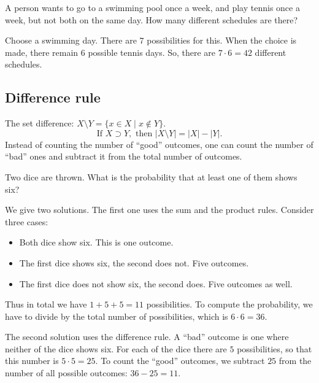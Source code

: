 \begin{page}
\setcounter{section}{1}
\setcounter{subsection}{2}
\setcounter{dfn}{2}
\label{portion:9}

\begin{exl}
A person wants to go to a swimming pool once a week, and play tennis once a week, but not both on the same day.
How many different schedules are there?

Choose a swimming day. There are $7$ possibilities for this.
When the choice is made, there remain $6$ possible tennis days.
So, there are $7 \cdot 6 = 42$ different schedules.
\end{exl}

\end{page}

\begin{page}
\setcounter{section}{1}
\setcounter{subsection}{3}
\setcounter{dfn}{2}
\label{portion:11}

\subsection{Difference rule}
The set difference: $X \setminus Y = \{x \in X \mid x \notin Y\}$.
\[
\text{If }X \supset Y, \text{ then } |X \setminus Y| = |X| - |Y|.
\]
Instead of counting the number of ``good'' outcomes,
one can count the number of ``bad'' ones and subtract it from the total number of outcomes.


\end{page}

\begin{page}
\setcounter{section}{1}
\setcounter{subsection}{3}
\setcounter{dfn}{3}
\label{portion:13}

\begin{exl}
Two dice are thrown. What is the probability that at least one of them shows six?

We give two solutions.
The first one uses the sum and the product rules.
Consider three cases:
\begin{itemize}
\item
Both dice show six. This is one outcome.
\item
The first dice shows six, the second does not. Five outcomes.
\item
The first dice does not show six, the second does. Five outcomes as well.
\end{itemize}
Thus in total we have $1+5+5=11$ possibilities.
To compute the probability, we have to divide by the total number of possibilities, which is $6 \cdot 6 = 36$.

The second solution uses the difference rule.
A ``bad'' outcome is one where neither of the dice shows six.
For each of the dice there are $5$ possibilities, so that this number is $5 \cdot 5 = 25$.
To count the ``good'' outcomes, we subtract $25$ from the number of all possible outcomes:
$36-25=11$.
\end{exl}

\end{page}

